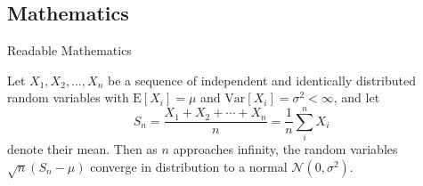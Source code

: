 \documentclass[10pt,compress]{beamer} %
\begin{document}
\subsection{Mathematics}

\begin{frame}{Readable Mathematics}

Let $X_1, X_2, \ldots, X_n$ be a sequence of independent and identically distributed random variables with $\text{E}[X_i] = \mu$ and $\text{Var}[X_i] = \sigma^2 < \infty$, and let
$$S_n = \frac{X_1 + X_2 + \cdots + X_n}{n}
      = \frac{1}{n}\sum_{i}^{n} X_i$$
denote their mean. Then as $n$ approaches infinity, the random variables $\sqrt{n}(S_n - \mu)$ converge in distribution to a normal $\mathcal{N}(0, \sigma^2)$.

\end{frame}
\end{document}
